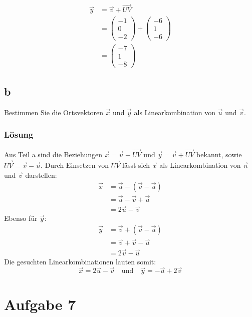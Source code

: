 \begin{align*}
    \vec{y} &= \vec{v} + \vec{UV} \\
    &= \begin{pmatrix}
        -1 \\ 0 \\ -2
    \end{pmatrix} + \begin{pmatrix}
        -6 \\ 1 \\ -6
    \end{pmatrix} \\
    &= \begin{pmatrix}
        -7 \\ 1 \\ -8
    \end{pmatrix}
\end{align*}

\subsection{b}

Bestimmen Sie die Ortsvektoren $\vec{x}$ und $\vec{y}$ als Linearkombination von $\vec{u}$ und $\vec{v}$.

\subsubsection*{Lösung}
Aus Teil a sind die Beziehungen $\vec{x} = \vec{u} - \vec{UV}$ und $\vec{y} = \vec{v} + \vec{UV}$ bekannt, sowie $\vec{UV} = \vec{v} - \vec{u}$. Durch Einsetzen von $\vec{UV}$ lässt sich $\vec{x}$ als Linearkombination von $\vec{u}$ und $\vec{v}$ darstellen:
\begin{align*}
    \vec{x} &= \vec{u} - (\vec{v} - \vec{u}) \\
    &= \vec{u} - \vec{v} + \vec{u} \\
    &= 2\vec{u} - \vec{v}
\end{align*}
Ebenso für $\vec{y}$:
\begin{align*}
    \vec{y} &= \vec{v} + (\vec{v} - \vec{u}) \\
    &= \vec{v} + \vec{v} - \vec{u} \\
    &= 2\vec{v} - \vec{u}
\end{align*}
Die gesuchten Linearkombinationen lauten somit:
\[
    \vec{x} = 2\vec{u} - \vec{v} \quad \text{und} \quad \vec{y} = - \vec{u} + 2\vec{v}
\]

\section{Aufgabe 7}

